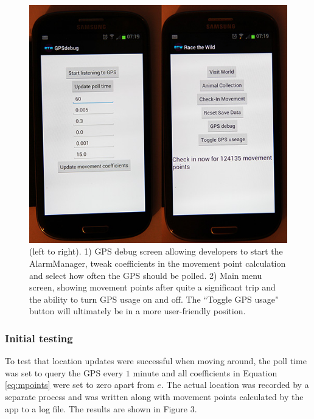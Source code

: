 \documentclass[12pt,a4paper,twoside]{article}
\begin{document}
\begin{figure}
\label{fig:gpsinterface}
\begin{center}
\includegraphics[scale=0.5]{phones.jpg}
\end{center}
\caption{(left to right). 1) GPS debug screen allowing developers to start the AlarmManager, tweak coefficients in the movement point calculation and select how often the GPS should be polled. 2) Main menu screen, showing movement points after quite a significant trip and the ability to turn GPS usage on and off. The ``Toggle GPS usage" button will ultimately be in a more user-friendly position.}
\end{figure}

\subsubsection{Initial testing}
To test that location updates were successful when moving around, the poll time was set to query the GPS every $1$ minute and all coefficients in Equation \ref{eq:mpoints} were set to zero apart from $e$. The actual location was recorded by a separate process and was written along with movement points calculated by the app to a log file. The results are shown in Figure 3.
\end{document}
